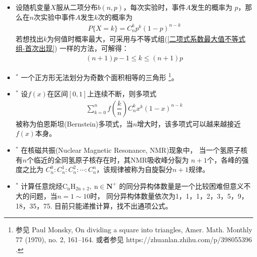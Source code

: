 \begin{itemize}[leftmargin=\inteval{\myitemleftmargin}pt,itemsep=
   \inteval{\myitemitempsep}pt,topsep=\inteval{\myitemtopsep}pt]
\item 设随机变量$ X $服从二项分布$ b(n,p) $，每次实验时，事件$ A $发生的概率为
$ p $，那么在$ n $次实验中事件$ A $发生$ k $次的概率为
\begin{align*}
    P\{X=k\}=C_n^kp^k(1-p)^{n-k}
\end{align*}
若想找出$ k $为何值时概率最大，可采用与不等式组(\ref{二项式系数最大值不等式组-首次出现})
一样的方法，可解得：
\begin{align*}
    (n+1)p-1\leq k \leq (n+1)p 
\end{align*}


\item $^*$ 一个正方形无法划分为奇数个面积相等的三角形
\footnote{参见 Paul Monsky, On dividing a square into triangles, Amer. Math. Monthly 77 (1970), no. 2, 161–164. 或者参见 https://zhuanlan.zhihu.com/p/398055396 . }。

\item $^*$ 设$ f(x) $在区间$ [0,1] $上连续不断，则多项式
\begin{gather*}
    \sum_{k=0}^{n}f\left(\dfrac{k}{n}\right)C_n^kx^k(1-x)^{n-k}
\end{gather*}
被称为伯恩斯坦(Bernstein)多项式，当$ n $增大时，该多项式可以越来越接近$ f(x) $本身。

\item $^*$ 在核磁共振(Nuclear Magnetic Resonance, NMR)现象中，
当一个氢原子核有$ n $个临近的全同氢原子核存在时，其NMR吸收峰分裂为
$ n+1 $个，各峰的强度之比为
$ C_n^0:C_n^1:C_n^2:\cdots :C_n^n $，该规律被称为自旋裂分$ n+1 $规律。

\item $^*$ 计算任意烷烃$ \mathrm{C_nH_{2n+2},\ n}\in \textbf{N}^+ $
的同分异构体数量是一个比较困难但意义不大的问题，当$ n=1\sim 10 $时，
同分异构体数量依次为1，1，1，2，3，5，9，18，35，75.
目前只能递推计算，找不出通项公式。


\end{itemize}
